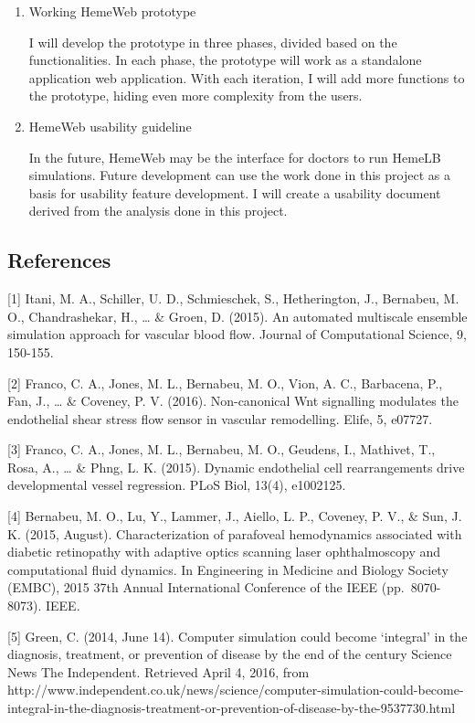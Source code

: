 \documentclass[]{article}
\begin{document}
\begin{enumerate}
\def\labelenumi{\arabic{enumi}.}
\item
  Working HemeWeb prototype

  I will develop the prototype in three phases, divided based on the
  functionalities. In each phase, the prototype will work as a
  standalone application web application. With each iteration, I will
  add more functions to the prototype, hiding even more complexity from
  the users.
\item
  HemeWeb usability guideline

  In the future, HemeWeb may be the interface for doctors to run HemeLB
  simulations. Future development can use the work done in this project
  as a basis for usability feature development. I will create a
  usability document derived from the analysis done in this project.
\end{enumerate}

\subsection{References}\label{references}

{[}1{]} Itani, M. A., Schiller, U. D., Schmieschek, S., Hetherington,
J., Bernabeu, M. O., Chandrashekar, H., \ldots{} \& Groen, D. (2015). An
automated multiscale ensemble simulation approach for vascular blood
flow. Journal of Computational Science, 9, 150-155.

{[}2{]} Franco, C. A., Jones, M. L., Bernabeu, M. O., Vion, A. C.,
Barbacena, P., Fan, J., \ldots{} \& Coveney, P. V. (2016). Non-canonical
Wnt signalling modulates the endothelial shear stress flow sensor in
vascular remodelling. Elife, 5, e07727.

{[}3{]} Franco, C. A., Jones, M. L., Bernabeu, M. O., Geudens, I.,
Mathivet, T., Rosa, A., \ldots{} \& Phng, L. K. (2015). Dynamic
endothelial cell rearrangements drive developmental vessel regression.
PLoS Biol, 13(4), e1002125.

{[}4{]} Bernabeu, M. O., Lu, Y., Lammer, J., Aiello, L. P., Coveney, P.
V., \& Sun, J. K. (2015, August). Characterization of parafoveal
hemodynamics associated with diabetic retinopathy with adaptive optics
scanning laser ophthalmoscopy and computational fluid dynamics. In
Engineering in Medicine and Biology Society (EMBC), 2015 37th Annual
International Conference of the IEEE (pp.~8070-8073). IEEE.

{[}5{]} Green, C. (2014, June 14). Computer simulation could become
`integral' in the diagnosis, treatment, or prevention of disease by the
end of the century \textbar{} Science \textbar{} News \textbar{} The
Independent. Retrieved April 4, 2016, from
http://www.independent.co.uk/news/science/computer-simulation-could-become-integral-in-the-diagnosis-treatment-or-prevention-of-disease-by-the-9537730.html
\end{document}
